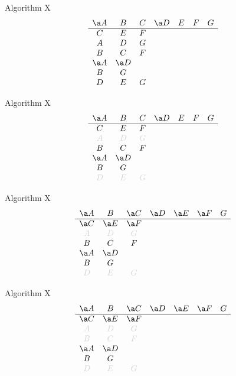 \documentclass[xcolor=svgnames]{beamer}
\begin{document}
%
\begin{frame}{Algorithm X}
\Large\boldmath
  $$
  \begin{array}{ccccccc}
    \a A & B & C & \a D & E & F & G\\
    \hline
    C & E & F &&&&\\
    A & D & G &&&&\\
    B & C & F &&&&\\
    \a A & \a D &&&&&\\
    B & G &&&&&\\
    D & E & G &&&&
  \end{array}
  $$
\end{frame}

%
\begin{frame}{Algorithm X}
\Large\boldmath
  $$
  \begin{array}{ccccccc}
    \a A & B & C & \a D & E & F & G\\
    \hline
    C & E & F &&&&\\
    \lg A & \lg D & \lg G &&&&\\
    B & C & F &&&&\\
    \a A & \a D &&&&&\\
    B & G &&&&&\\
    \lg D & \lg E & \lg G &&&&
  \end{array}
  $$
\end{frame}

%
\begin{frame}{Algorithm X}
\Large\boldmath
  $$
  \begin{array}{ccccccc}
    \a A & B & \a C & \a D & \a E & \a F & G\\
    \hline
    \a C & \a E & \a F &&&&\\
    \lg A & \lg D & \lg G &&&&\\
    B & C & F &&&&\\
    \a A & \a D &&&&&\\
    B & G &&&&&\\
    \lg D & \lg E & \lg G &&&&
  \end{array}
  $$
\end{frame}

%
\begin{frame}{Algorithm X}
\Large\boldmath
  $$
  \begin{array}{ccccccc}
    \a A & B & \a C & \a D & \a E & \a F & G\\
    \hline
    \a C & \a E & \a F &&&&\\
    \lg A & \lg D & \lg G &&&&\\
    \lg B & \lg C & \lg F &&&&\\
    \a A & \a D &&&&&\\
    B & G &&&&&\\
    \lg D & \lg E & \lg G &&&&
  \end{array}
  $$
\end{frame}
\end{document}
